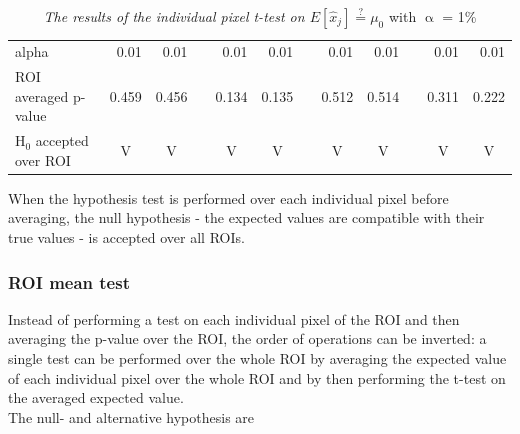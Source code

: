 \documentclass[report,12pt]{report}
\newcommand{\subscript}[1]{\ensuremath{_{\textrm{#1}}}}
\begin{document}
\begin{table}[H]
{\begin{tabular}{l|r|r|r|r|r|r|r|r|r|r|r|}
\cline{1-3} \cline{5-6} \cline{8-9} \cline{11-12} 
\multicolumn{1}{|l|}{alpha}               & 0.01                     & 0.01                     &                       & 0.01                     & 0.01                     &                       & 0.01                     & 0.01                     &                       & 0.01                     & 0.01                     \\ 
\multicolumn{1}{|l|}{ROI averaged p-value}               & 0.459                     & 0.456                     &                       & 0.134                     & 0.135                     &                       & 0.512                     & 0.514                     &                       & 0.311                     & 0.222                     \\ 
\cline{1-3} \cline{5-6} \cline{8-9} \cline{11-12} 
\multicolumn{1}{|l|}{H\subscript{0} accepted over ROI}                        & \multicolumn{1}{c|}{V}    & \multicolumn{1}{c|}{V}    & \multicolumn{1}{c|}{} & \multicolumn{1}{c|}{V}    & \multicolumn{1}{c|}{V}    & \multicolumn{1}{c|}{} & \multicolumn{1}{c|}{V}    & \multicolumn{1}{c|}{V}    & \multicolumn{1}{c|}{} & \multicolumn{1}{c|}{V}    & \multicolumn{1}{c|}{V}    \\ \cline{1-3} \cline{5-6} \cline{8-9} \cline{11-12} 
\end{tabular}}
\caption{\emph{The results of the individual pixel t-test on $E[\hat x_j] \overset{?}{=} \mu_0$} with $\upalpha$ = 1\%}
\label{tab:ttest}
\end{table}
\intextsep{}

When the hypothesis test is performed over each individual pixel before averaging, the null hypothesis - the expected values are compatible with their true values - is accepted over all ROIs.




\subsubsection*{ROI mean test}
Instead of performing a test on each individual pixel of the ROI and then averaging the p-value over the ROI, the order of operations can be inverted: a single test can be performed over the whole ROI by averaging the expected value of each individual pixel over the whole ROI and by then performing the t-test on the averaged expected value.\\

The null- and alternative hypothesis are\\
\end{document}
